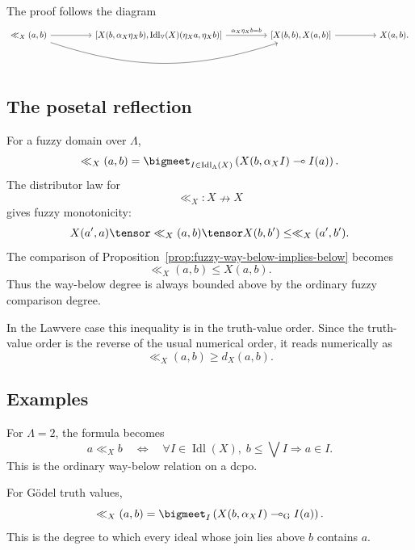 The proof follows the diagram
\[
\begin{tikzcd}[column sep=huge,row sep=large]
{\ll_X(a,b)}
    \ar[r]
    \ar[rr,bend right=18]
&
{\left[
    X(b,\alpha_X\eta_X b),
    \operatorname{Idl}_{\mathbb V}(X)(\eta_X a,\eta_X b)
\right]}
    \ar[r,"{\alpha_X\eta_X b=b}"]
&
{\left[
    X(b,b),
    X(a,b)
\right]}
    \ar[r]
&
{X(a,b)}.
\end{tikzcd}
\]

\subsection{The posetal reflection}
\label{subsec:fuzzy-way-below-posetal}

For a fuzzy domain over \(\Lambda\),
\[
    \ll_X(a,b)
    =
    \bigmeet_{I\in\operatorname{Idl}_\Lambda(X)}
    \left(
        X(b,\alpha_X I)\multimap I(a)
    \right).
\]
The distributor law for
\[
    \ll_X:X\nrightarrow X
\]
gives fuzzy monotonicity:
\[
    X(a',a)\tensor \ll_X(a,b)\tensor X(b,b')
    \leq
    \ll_X(a',b').
\]
The comparison of Proposition~\ref{prop:fuzzy-way-below-implies-below} becomes
\[
    \ll_X(a,b)\leq X(a,b).
\]
Thus the way-below degree is always bounded above by the ordinary fuzzy comparison
degree.

In the Lawvere case this inequality is in the truth-value order. Since the
truth-value order is the reverse of the usual numerical order, it reads
numerically as
\[
    \ll_X(a,b)\geq d_X(a,b).
\]

\subsection{Examples}
\label{subsec:fuzzy-way-below-examples}

\begin{example}
\label{ex:fuzzy-way-below-crisp}
For \(\Lambda=2\), the formula becomes
\[
    a\ll_X b
    \quad\Longleftrightarrow\quad
    \forall I\in\operatorname{Idl}(X),\;
    b\leq \bigvee I\Rightarrow a\in I.
\]
This is the ordinary way-below relation on a dcpo.
\end{example}

\begin{example}
\label{ex:fuzzy-way-below-godel}
For G\"odel truth values,
\[
    \ll_X(a,b)
    =
    \bigmeet_{I}
    \left(
        X(b,\alpha_X I)\multimap_{\mathrm G} I(a)
    \right).
\]
This is the degree to which every ideal whose join lies above \(b\) contains
\(a\).
\end{example}

